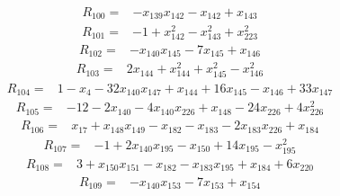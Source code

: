 \begin{equation*}\begin{split}
R_{100}={}&-x_{139} x_{142} - x_{142} + x_{143}
\end{split}\end{equation*}
\begin{equation*}\begin{split}
R_{101}={}&-1 + x_{142}^{2} - x_{143}^{2} + x_{223}^{2}
\end{split}\end{equation*}
\begin{equation*}\begin{split}
R_{102}={}&-x_{140} x_{145} - 7x_{145} + x_{146}
\end{split}\end{equation*}
\begin{equation*}\begin{split}
R_{103}={}&2x_{144} + x_{144}^{2} + x_{145}^{2} - x_{146}^{2}
\end{split}\end{equation*}
\begin{equation*}\begin{split}
R_{104}={}&1 - x_{4} - 32x_{140} x_{147} + x_{144} + 16x_{145} - x_{146} + 33x_{147}
\end{split}\end{equation*}
\begin{equation*}\begin{split}
R_{105}={}&-12 - 2x_{140} - 4x_{140} x_{226} + x_{148} - 24x_{226} + 4x_{226}^{2}
\end{split}\end{equation*}
\begin{equation*}\begin{split}
R_{106}={}&x_{17} + x_{148} x_{149} - x_{182} - x_{183} - 2x_{183} x_{226} + x_{184}
\end{split}\end{equation*}
\begin{equation*}\begin{split}
R_{107}={}&-1 + 2x_{140} x_{195} - x_{150} + 14x_{195} - x_{195}^{2}
\end{split}\end{equation*}
\begin{equation*}\begin{split}
R_{108}={}&3 + x_{150} x_{151} - x_{182} - x_{183} x_{195} + x_{184} + 6x_{220}
\end{split}\end{equation*}
\begin{equation*}\begin{split}
R_{109}={}&-x_{140} x_{153} - 7x_{153} + x_{154}
\end{split}\end{equation*}

